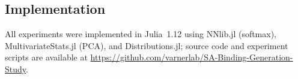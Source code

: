 \subsection{Implementation}

All experiments were implemented in Julia~1.12 using NNlib.jl
(softmax), MultivariateStats.jl (PCA), and Distributions.jl; source code and experiment scripts
are available at \url{https://github.com/varnerlab/SA-Binding-Generation-Study}.
